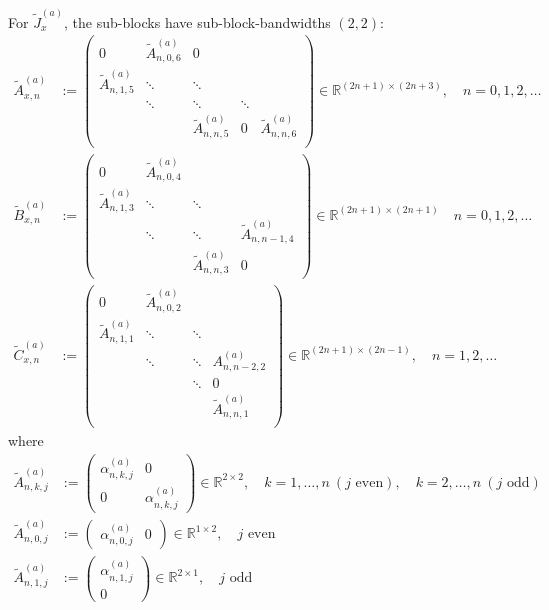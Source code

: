 \documentclass[11pt, oneside]{article}   	%
\newcommand{\R}{\mathbb{R}}
\newcommand{\alphaa}{\alpha^{(a)}}
\begin{document}
For $\tilde J_x^{(a)}$, the sub-blocks have sub-block-bandwidths $(2,2)$:
\begin{align*}
	\tilde A^{(a)}_{x,n} &:= 
		\begin{pmatrix}
			0 & \tilde A^{(a)}_{n,0,6} & 0 & & \\
			\tilde A^{(a)}_{n,1,5} & \ddots & \ddots & & \\
			& \ddots & \ddots & \ddots & \\
			& & \tilde A^{(a)}_{n,n,5} & 0 & \tilde A^{(a)}_{n,n,6} \\
		\end{pmatrix} \in \R^{(2n+1)\times(2n+3)}, \quad n = 0,1,2,\dots \\
	\tilde B^{(a)}_{x,n} &:= 
		\begin{pmatrix}
			0 & \tilde A^{(a)}_{n,0,4} & & \\
			\tilde A^{(a)}_{n,1,3} & \ddots & \ddots & \\
			& \ddots & \ddots & \tilde A^{(a)}_{n,n-1,4} \\
			& & \tilde A^{(a)}_{n,n,3} & 0
		\end{pmatrix} \in \R^{(2n+1)\times(2n+1)}  \quad n = 0,1,2,\dots \\
	\tilde C^{(a)}_{x,n} &:= 
		\begin{pmatrix}
			0 & \tilde A^{(a)}_{n,0,2} & & \\
			\tilde A^{(a)}_{n,1,1} & \ddots & \ddots & \\
			& \ddots & \ddots &A^{(a)}_{n,n-2,2} \\
			& & \ddots & 0 \\
			& & & \tilde A^{(a)}_{n,n,1} \\
		\end{pmatrix} \in \R^{(2n+1)\times(2n-1)}, \quad n = 1,2,\dots
\end{align*}
where
\begin{align*}
	\tilde A^{(a)}_{n,k,j} &:= 
		\begin{pmatrix}
			\alphaa_{n,k,j} & 0 \\
			0 & \alphaa_{n,k,j}
		\end{pmatrix} \in \R^{2\times2}, \quad k = 1,\dots,n \: (j \text{ even}), \quad k = 2,\dots,n \: (j \text{ odd}) \\
	\tilde A^{(a)}_{n,0,j} &:=
		\begin{pmatrix}
			\alphaa_{n,0,j} & 0
		\end{pmatrix} \in \R^{1\times2}, \quad j \text{ even} \\
	\tilde A^{(a)}_{n,1,j} &:=
		\begin{pmatrix}
			\alphaa_{n,1,j} \\
			0
		\end{pmatrix} \in \R^{2\times1}, \quad j \text{ odd} \\
\end{align*}
\end{document}
